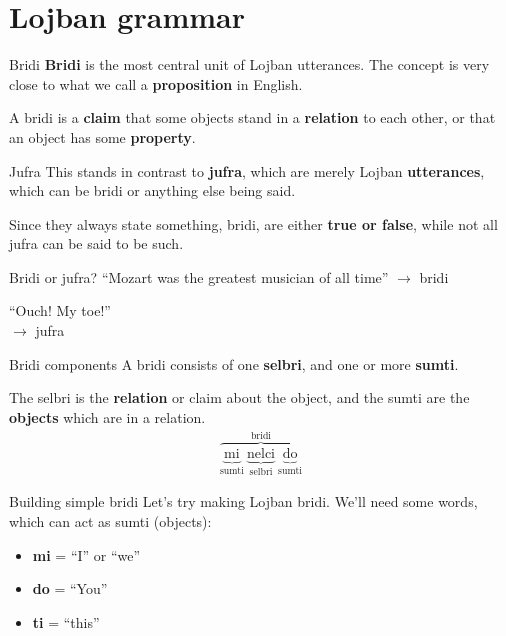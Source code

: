 \section{Lojban grammar}
\begin{frame}{Bridi}
    \textbf{Bridi} is the most central unit of Lojban utterances. The concept is very close to what we call a \textbf{proposition} in English.

    \pause
    A bridi is a \textbf{claim} that some objects stand in a \textbf{relation} to each other, or that an object has some \textbf{property}.
\end{frame}

\begin{frame}{Jufra}
    This stands in contrast to \textbf{jufra}, which are merely Lojban \textbf{utterances}, which can be bridi or anything else being said.

    \pause
    Since they always state something, bridi, are either \textbf{true or false}, while not all jufra can be said to be such.
\end{frame}

\begin{frame}{Bridi or jufra?}
    ``Mozart was the greatest musician of all time'' $\rightarrow$
    \pause
    bridi

    \pause
    ``Ouch! My toe!''\\$\rightarrow$
    \pause
    jufra
\end{frame}

\begin{frame}{Bridi components}
    A bridi consists of one \textbf{selbri}, and one or more \textbf{sumti}.

    \pause
    The selbri is the \textbf{relation} or claim about the object, and the sumti are the \textbf{objects} which are in a relation.
    \pause
    \begin{align*}
        \overbrace{\underbrace{\text{mi}}_{\text{sumti}}~\underbrace{\text{nelci}}_{\text{selbri}}~\underbrace{\text{do}}_{\text{sumti}}}^{\text{bridi}}
    \end{align*}
\end{frame}

\begin{frame}{Building simple bridi}
    Let's try making Lojban bridi. We'll need some words, which can act as sumti (objects):
    \begin{itemize}
        \item \textbf{mi} = ``I'' or ``we''
        \item \textbf{do} = ``You''
        \item \textbf{ti} = ``this''
    \end{itemize}
\end{frame}

